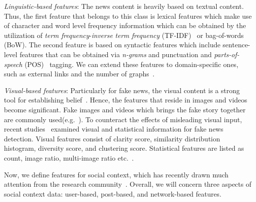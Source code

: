 \begin{description}
    \item{\emph{Linguistic-based features}:} The news content is heavily based on textual content. Thus, the first feature that belongs to this class is lexical features which make use of character and word level frequency information which can be obtained by the utilization of
    \emph{term frequency}-\emph{inverse term frequency} (TF-IDF)~\parencite{TF_Luhn, IDF_Jones} or bag-of-words (BoW). The second feature is based on syntactic features which include sentence-level features that can be obtained via \emph{n-grams} and punctuation and \emph{parts-of-speech} (POS)~\parencite{POS_Daelemans} tagging. We can extend these features to domain-specific ones, such as external links and the number of graphs~\parencite{AStylometricInquiry_Potthast}.
    \item{\emph{Visual-based features}:} Particularly for fake news, the visual content is a strong tool for establishing
    belief~\parencite{VisualMisAndDisinformation_Viorela}. Hence, the features that reside in images and videos become significant. Fake images
    and videos which brings the fake story together are commonly used(e.g.~\cite{PutinBehindBars_Harding, DeepFakeQueensSpeech_Sawer}). To counteract the effects of misleading visual input, recent studies~\parencite{ExploitingMultiDomainVisualInformation_Qi} examined visual and statistical information for fake news detection. Visual features consist of clarity score, similarity distribution histogram, diversity score, and clustering score. Statistical features are listed
    as count, image ratio, multi-image ratio etc.~\parencite{FakeNewsDetectionOnSocialMediaADataMiningPerspective_Shu}.
\end{description}
Now, we define features for social context, which has recently drawn much attention from the research community~\parencite{BeyondNewsContents_Shu, HierarchicalPropagationNetworksForFND_Shu}. Overall, we will concern three aspects of social context data: user-based, post-based, and network-based features.
